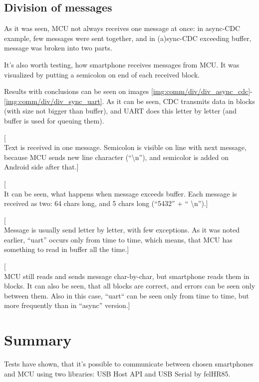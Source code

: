 \clearpage

\subsection{Division of messages}
As it was seen, MCU not always receives one message at once:
in async-CDC example, few messages were sent together, and in (a)sync-CDC
exceeding buffer, message was broken into two parts.

It's also worth testing, how smartphone receives messages from MCU.
It was visualized by putting a semicolon on end of each received block.

Results with conclusions can be seen on images
\ref{img:comm/div/div_async_cdc}-\ref{img:comm/div/div_sync_uart}.
As it can be seen, CDC transmits data in blocks (with size not bigger than
buffer), and UART does this letter by letter (and buffer is used for queuing
them).

[\\Text is received in one message. 
Semicolon is visible on line with next message, because MCU sends new line
character (``\textbackslash n''), and semicolor is added on Android side after that.]

[\\It can be seen, what happens when message exceeds buffer.
Each message is received as two:
64 chars long, and 5 chars long (``5432'' + `` \textbackslash n'').]

[\\Message is usually send letter by letter, with few exceptions.
As it was noted earlier, ``uart'' occurs only from time to time, which means,
that MCU has something to read in buffer all the time.]

[\\MCU still reads and sends message char-by-char, but smartphone reads them in
blocks. 
It can also be seen, that all blocks are correct, and errors can be
seen only between them. 
Also in this case, ``uart`` can be seen only from time to time, but more
frequently than in ``async'' version.]


\clearpage

\section{Summary}
Tests have shown, that it's possible to communicate between chosen smartphones
and MCU using two libraries: USB Host API and USB Serial by felHR85.

